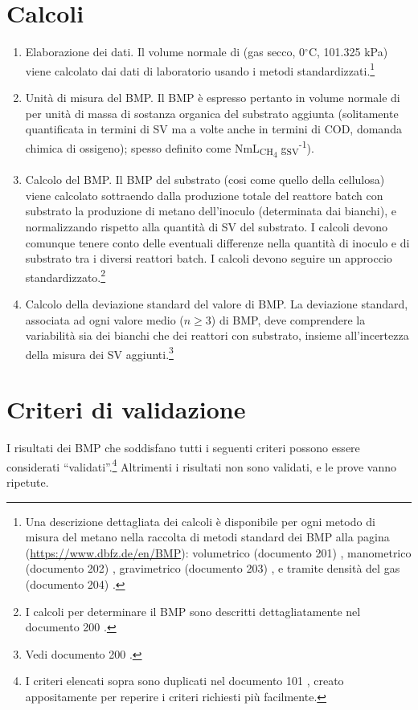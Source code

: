 \documentclass[]{article}
\begin{document}
\section{Calcoli}
\label{sec:calculations}
\begin{enumerate}
  \item Elaborazione dei dati.
    Il volume normale di  (gas secco, 0$^\circ$C, 101.325 kPa) viene calcolato dai dati di laboratorio usando i metodi standardizzati.\footnote{
      Una descrizione dettagliata dei calcoli è disponibile per ogni metodo di misura del metano nella raccolta di metodi standard dei BMP alla pagina (\url{https://www.dbfz.de/en/BMP}): volumetrico (documento 201) \citep{BMPdoc201vol}, manometrico (documento 202) \citep{BMPdoc202man}, gravimetrico (documento 203) \citep{BMPdoc203grav}, e tramite densità del gas (documento 204) \citep{BMPdoc204gasdens}.
    }
  \item Unità di misura del BMP.
    Il BMP è espresso pertanto in volume normale di  per unità di massa di sostanza organica del substrato aggiunta (solitamente quantificata in termini di SV ma a volte anche in termini di COD, domanda chimica di ossigeno); spesso definito come NmL\textsubscript{CH\textsubscript{4}} g\textsubscript{SV}\textsuperscript{-1}). 
  \item Calcolo del BMP. 
    Il BMP del substrato (cosi come quello della cellulosa) viene calcolato sottraendo dalla produzione totale del reattore batch con substrato la produzione di metano dell’inoculo (determinata dai bianchi), e normalizzando rispetto alla quantità di SV del substrato. 
    I calcoli devono comunque tenere conto delle eventuali differenze nella quantità di inoculo e di substrato tra i diversi reattori batch. I calcoli devono seguire un approccio standardizzato.\footnote{
      I calcoli per determinare il BMP sono descritti dettagliatamente nel documento 200 \citep{BMPdoc200BMP}.
    }
  \item Calcolo della deviazione standard del valore di BMP. 
    La deviazione standard, associata ad ogni valore medio ($n \ge 3$) di BMP, deve comprendere la variabilità sia dei bianchi che dei reattori con substrato, insieme all’incertezza della misura dei SV aggiunti.\footnote{
      Vedi documento 200 \citep{BMPdoc200BMP}. 
    }
\end{enumerate}

\section{Criteri di validazione}
\label{sec:crit}
I risultati dei BMP che soddisfano tutti i seguenti criteri possono essere considerati ``validati''.\footnote{
  I criteri elencati sopra sono duplicati nel documento 101 \citep{BMPdoc101val}, creato appositamente per reperire i criteri richiesti più facilmente.
}
Altrimenti i risultati non sono validati, e le prove vanno ripetute.
\end{document}
